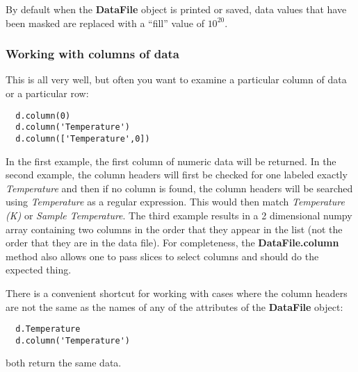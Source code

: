 \documentclass[a4paper,11pt]{scrartcl}
\begin{document}
By default when the \textbf{DataFile} object is printed or saved, data values that have been masked are replaced with a ``fill'' value of $10^{20}$.


\subsubsection{Working with columns of data}

This is all very well, but often you want to examine a particular column of data
or a particular row:
\begin{lstlisting}
  d.column(0)
  d.column('Temperature')
  d.column(['Temperature',0])
\end{lstlisting}
In the first example, the first column of numeric data will be returned. In the
second example, the column headers will first be checked for one labeled exactly
\textit{Temperature} and then if no column is found, the column headers will be
searched using \textit{Temperature} as a regular expression. This would then
match \textit{Temperature (K)} or \textit{Sample Temperature}.  The third
example results in a 2 dimensional numpy array containing two columns in the
order that they appear in the list (\ie not the order that they are in the data
file). For completeness, the \textbf{DataFile.column} method also allows one to
pass slices to select columns and should do the expected thing.

There is a convenient shortcut for working with cases where the column headers are not the same
as the names of any of the attributes of the \textbf{DataFile} object:
\begin{lstlisting}
  d.Temperature
  d.column('Temperature')
\end{lstlisting}
both return the same data.
\end{document}
